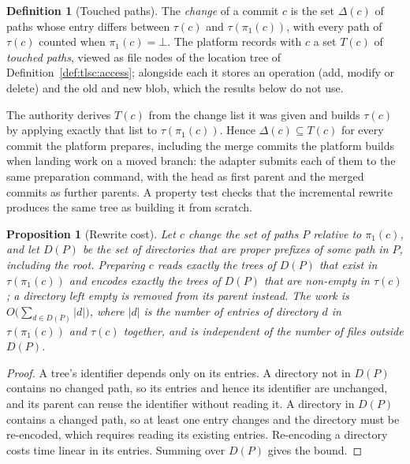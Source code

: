 \documentclass[11pt,letterpaper]{article}
\newtheorem{proposition}[theorem]{Proposition}
\theoremstyle{definition}
\newtheorem{definition}[theorem]{Definition}
\theoremstyle{remark}
\newcommand{\tree}{\tau}
\newcommand{\fp}{\pi_1}
\begin{document}
\begin{definition}[Touched paths]
\label{def:tlsc:touched}
The \emph{change} of a commit $c$ is the set $\Delta(c)$ of paths whose entry differs between $\tree(c)$ and $\tree(\fp(c))$, with every path of $\tree(c)$ counted when $\fp(c)=\bot$. The platform records with $c$ a set $T(c)$ of \emph{touched paths}, viewed as file nodes of the location tree of Definition~\ref{def:tlsc:access}; alongside each it stores an operation (add, modify or delete) and the old and new blob, which the results below do not use.
\end{definition}

The authority derives $T(c)$ from the change list it was given and builds $\tree(c)$ by applying exactly that list to $\tree(\fp(c))$. Hence $\Delta(c)\subseteq T(c)$ for every commit the platform prepares, including the merge commits the platform builds when landing work on a moved branch: the adapter submits each of them to the same preparation command, with the head as first parent and the merged commits as further parents. A property test checks that the incremental rewrite produces the same tree as building it from scratch.

\begin{proposition}[Rewrite cost]
\label{prop:tlsc:rewrite}
Let $c$ change the set of paths $P$ relative to $\fp(c)$, and let $D(P)$ be the set of directories that are proper prefixes of some path in $P$, including the root. Preparing $c$ reads exactly the trees of $D(P)$ that exist in $\tree(\fp(c))$ and encodes exactly the trees of $D(P)$ that are non-empty in $\tree(c)$; a directory left empty is removed from its parent instead. The work is $O\bigl(\sum_{d\in D(P)}|d|\bigr)$, where $|d|$ is the number of entries of directory $d$ in $\tree(\fp(c))$ and $\tree(c)$ together, and is independent of the number of files outside $D(P)$.
\end{proposition}

\begin{proof}
A tree's identifier depends only on its entries. A directory not in $D(P)$ contains no changed path, so its entries and hence its identifier are unchanged, and its parent can reuse the identifier without reading it. A directory in $D(P)$ contains a changed path, so at least one entry changes and the directory must be re-encoded, which requires reading its existing entries. Re-encoding a directory costs time linear in its entries. Summing over $D(P)$ gives the bound.
\end{proof}
\end{document}
